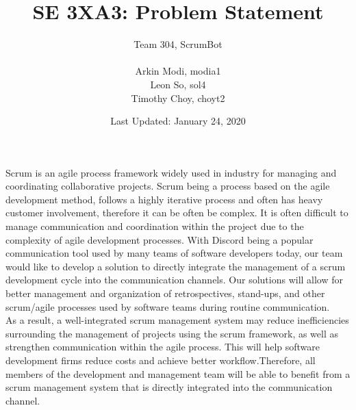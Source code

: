 \documentclass[12pt]{article}
\title{SE 3XA3: Problem Statement}
\author{
	Team 304, ScrumBot \\
		\\ Arkin Modi, modia1
        \\ Leon So, sol4
        \\ Timothy Choy, choyt2
}
\date{Last Updated: January 24, 2020}
\begin{document}
\maketitle

Scrum is an agile process framework widely used in industry for managing and coordinating collaborative projects. Scrum being a process based on the agile development method, follows a highly iterative process and often has heavy customer involvement, therefore it can be often be complex. It is often difficult to manage communication and coordination within the project due to the complexity of agile development processes. With Discord being a popular communication tool used by many teams of software developers today, our team would like to develop a solution to directly integrate the management of a scrum development cycle into the communication channels. Our solutions will allow for better management and organization of retrospectives, stand-ups, and other scrum/agile processes used by software teams during routine communication.\\

As a result, a well-integrated scrum management system may reduce inefficiencies surrounding the management of projects using the scrum framework, as well as strengthen communication within the agile process. This will help software development firms reduce costs and achieve better workflow.Therefore, all members of the development and management team will be able to benefit from a scrum management system that is directly integrated into the communication channel.
\end{document}
